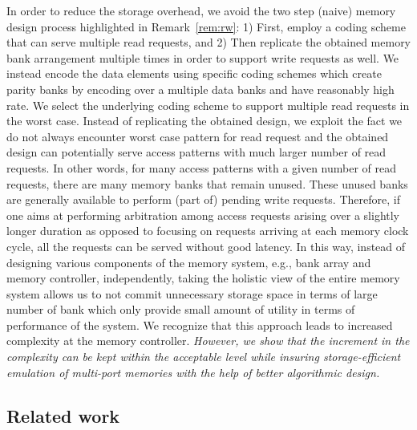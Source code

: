 In order to reduce the storage overhead, we avoid the two step (naive) memory design process highlighted in Remark~\ref{rem:rw}: 1) First, employ a coding scheme that can serve multiple read requests, and 2) Then replicate the obtained memory bank arrangement multiple times in order to support write requests as well. We instead encode the data elements using specific coding schemes which create parity banks by encoding over a multiple data banks and have reasonably high rate. We select the underlying coding scheme to support multiple read requests in the worst case. Instead of replicating the obtained design, we exploit the fact we do not always encounter worst case pattern for read request and the obtained design can potentially serve access patterns with much larger number of read requests. In other words, for many access patterns with a given number of read requests, there are many memory banks that remain unused. These unused banks are generally available to perform (part of) pending write requests. Therefore, if one aims at performing arbitration among access requests arising over a slightly longer duration as opposed to focusing on requests arriving at each memory clock cycle, all the requests can be served without good latency. In this way, instead of designing various components of the memory system, e.g., bank array and memory controller, independently, taking the holistic view of the entire memory system allows us to not commit unnecessary storage space in terms of large number of bank which only provide small amount of utility in terms of performance of the system. We recognize that this approach leads to increased complexity at the memory controller. {\color{red} {\em However, we show that the increment in the complexity can be kept within the acceptable level while insuring storage-efficient emulation of multi-port memories with the help of better algorithmic design.}}

\subsection{Related work}

